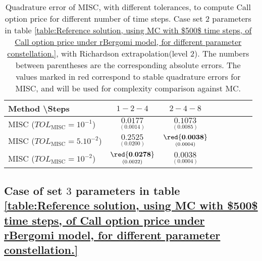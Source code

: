 \begin{table}[!h]
	\centering
	\begin{tabular}{l*{6}{c}r}
		Method \textbackslash  Steps            & $1-2-4$ & $2-4-8$  \\
		\hline
		MISC ($TOL_{\text{MISC}}=10^{-1}$)  & $\underset{(    0.0014)}{\mathbf{  0.0177}}$ & $\underset{(  0.0085)}{\mathbf{0.1073}}$  \\
		MISC ($TOL_{\text{MISC}}=5.10^{-2}$)  & $\underset{(  0.0200)}{\mathbf{  0.2525}}$ & $\underset{(0.0004)}{\mathbf{\red{0.0038}}}$   \\
		MISC ($TOL_{\text{MISC}}=10^{-2}$)  & $\underset{(0.0022)}{\mathbf{\red{0.0278}}}$ &     $\underset{(0.0004)}{\mathbf{0.0038}}$  \\
		
%		
		
		\hline
	\end{tabular}
	\caption{Quadrature error of MISC, with different tolerances, to compute Call option price   for different number of time steps. Case set $2$ parameters in table \ref{table:Reference solution, using MC with $500$ time steps, of Call option price under rBergomi model, for different parameter constellation.}, with Richardson extrapolation(level $2$). The numbers between parentheses are the corresponding absolute errors. The values marked in red correspond to stable quadrature errors for MISC, and will be used for complexity comparison against MC.}
	\label{Quadrature error of MISC to compute Call option price of the different tolerances for different number of time steps. Case set $2$ parameters, with Richardson extrapolation(level $2$). The numbers between parentheses are the corresponding absolute errors,linear}
\end{table}



\FloatBarrier

\subsection{Case of set $3$ parameters in table \ref{table:Reference solution, using MC with $500$ time steps, of Call option price under rBergomi model, for different parameter constellation.}}\label{appendix:Case of set 3 parameters}


